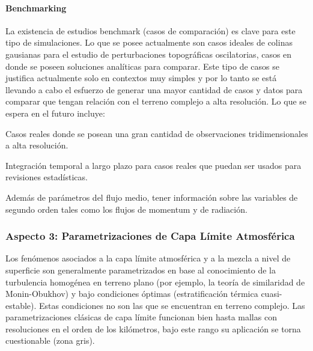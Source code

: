 \paragraph{Benchmarking} La existencia de estudios benchmark (casos de comparación) es clave para este tipo de simulaciones. Lo que se posee actualmente son casos ideales de colinas gausianas para el estudio de perturbaciones topográficas oscilatorias, casos en donde se poseen soluciones analíticas para comparar. Este tipo de casos se justifica actualmente solo en contextos muy simples y por lo tanto se está llevando a cabo el esfuerzo de generar una mayor cantidad de casos y datos para comparar que tengan relación con el terreno complejo a alta resolución. Lo que se espera en el futuro incluye:
\begin{itemize*}
	\item Casos reales donde se posean una gran cantidad de observaciones tridimensionales a alta resolución.
	\item Integración temporal a largo plazo para casos reales que puedan ser usados para revisiones estadísticas.
	\item Además de parámetros del flujo medio, tener información sobre las variables de segundo orden tales como los flujos de momentum y de radiación.
\end{itemize*} 
\subsubsection{Aspecto 3: Parametrizaciones de Capa Límite Atmosférica}
Los fenómenos asociados a la capa límite atmosférica y a la mezcla a nivel de superficie son generalmente parametrizados en base al conocimiento de la turbulencia homogénea en terreno plano (por ejemplo, la teoría de similaridad de Monin-Obukhov) y bajo condiciones óptimas (estratificación térmica cuasi-estable). Estas condiciones no son las que se encuentran en terreno complejo. Las parametrizaciones clásicas de capa límite funcionan bien hasta mallas con resoluciones en el orden de los kilómetros, bajo este rango su aplicación se torna cuestionable (zona gris).

